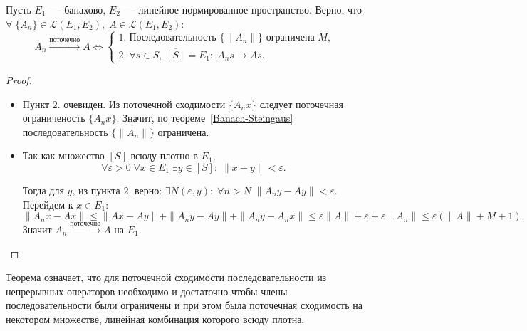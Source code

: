 \begin{theorem}
\label{bshetengcorollary}
    Пусть $E_1$~--- банахово, $E_2$~--- линейное нормированное пространство. Верно, что $\forall\; \{A_n\} \in \mathcal{L}(E_1, E_2),\; A \in \mathcal{L}(E_1, E_2)$:
    \[
    A_n \xrightarrow{\textit{поточечно}} A \Leftrightarrow
    \begin{cases}
        1.\;\text{Последовательность }\{\|A_n\|\}\text{ ограничена } M,\\
        2.\;\forall s \in S, \; \overline{[S]} = E_1: \; A_n s \to As.
    \end{cases}
    \]
\end{theorem}
\begin{proof}
    \begin{itemize}
        \item[$\Rightarrow$] Пункт $2.$ очевиден. Из поточечной сходимости $\{A_n x\}$ следует поточечная ограниченость $\{A_n x\}$. Значит, по теореме~\ref{Banach-Steingaus} последовательность $\{\|A_n\|\}$ ограничена.
        \item[$\Leftarrow$]
        Так как множество $[S]$ всюду плотно в $E_1$,
        \[\forall \varepsilon > 0\; \forall x \in E_1\; \exists y \in [S]:\; \|x - y\| < \varepsilon.\]

        Тогда для $y$, из пункта $2.$ верно:
        \(\exists N(\varepsilon, y):\; \forall n > N\; \|A_n y - Ay\| < \varepsilon\). Перейдем к $x \in E_1$:
        \[
            \|A_n x - Ax\| \leqslant \|Ax - Ay\| + \|A_n y - Ay\| + \|A_n y - A_n x\|
             \leqslant \varepsilon \|A\| + \varepsilon + \varepsilon \|A_n\| \leqslant \varepsilon (\|A\| + M + 1).
        \]
        Значит $A_n \xrightarrow{\textit{поточечно}} A$ на $E_1$.
    \end{itemize}
\end{proof}
\begin{note}
    Теорема означает, что для поточечной сходимости последовательности из непрерывных операторов необходимо и достаточно чтобы члены последовательности были ограничены и при этом была поточечная сходимость на некотором множестве, линейная комбинация которого всюду плотна.
\end{note}